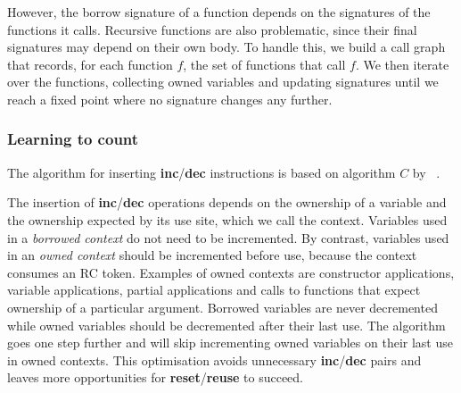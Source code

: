 However, the borrow signature of a function depends on the signatures of the functions it calls. Recursive functions are also problematic, since their final signatures may depend on their own body.
To handle this, we build a call graph that records, for each function $f$, the set of functions that call $f$.
We then iterate over the functions, collecting owned variables and updating signatures until we reach a fixed point where no signature changes any further.


\subsubsection{Learning to count}\label{section:refcount:beans:counting}


The algorithm for inserting \textbf{inc}/\textbf{dec} instructions is based on algorithm $C$ by \citeauthor*{ullrich_counting_2021}~\cite{ullrich_counting_2021}.



The insertion of \textbf{inc}/\textbf{dec} operations depends on the ownership of a variable and the ownership expected by its use site, which we call the context.
Variables used in a \textit{borrowed context} do not need to be incremented.
By contrast, variables used in an \textit{owned context} should be incremented before use, because the context consumes an RC token.
Examples of owned contexts are constructor applications, variable applications, partial applications and calls to functions that expect ownership of a particular argument.
Borrowed variables are never decremented while owned variables should be decremented after their last use. 
The algorithm goes one step further and will skip incrementing owned variables on their last use in owned contexts. This optimisation avoids unnecessary \textbf{inc}/\textbf{dec} pairs and leaves more opportunities for \textbf{reset}/\textbf{reuse} to succeed.

